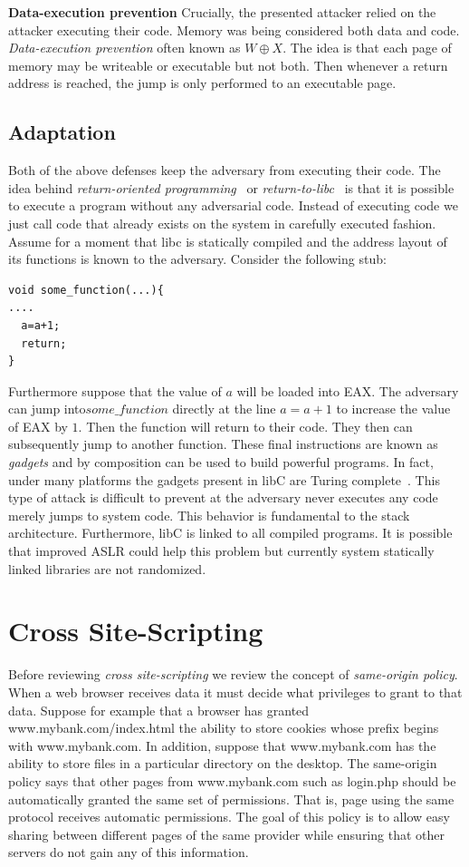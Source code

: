 \documentclass{article}
\begin{document}
\textbf{Data-execution prevention}
Crucially, the presented attacker relied on the attacker executing their code.  Memory was being considered both data and code.  \emph{Data-execution prevention} often known as $W\oplus X$.  The idea is that each page of memory may be writeable or executable but not both.  Then whenever a return address is reached, the jump is only performed to an executable page.

\subsection{Adaptation}
Both of the above defenses keep the adversary from executing their code.  The idea behind \emph{return-oriented programming}~\cite{shachamROP} or \emph{return-to-libc}~\cite{shachamReturnLibC} is that it is possible to execute a program without any adversarial code.  Instead of executing code we just call code that already exists on the system in carefully executed fashion.  Assume for a moment that libc is statically compiled and the address layout of its functions is known to the adversary.  Consider the following stub:

\begin{lstlisting}
void some_function(...){
....
  a=a+1;
  return;
}
\end{lstlisting}

Furthermore suppose that the value of $a$ will be loaded into EAX.  The adversary can jump into$some\_function$ directly at the line $a=a+1$ to increase the value of EAX by $1$.  Then the function will return to their code.  They then can subsequently jump to another function.  These final instructions are known as \emph{gadgets} and by composition can be used to build powerful programs.  In fact, under many platforms the gadgets present in libC are Turing complete~\cite{shachamROPcomplete}.  This type of attack is difficult to prevent at the adversary never executes any code merely jumps to system code.  This behavior is fundamental to the stack architecture.  Furthermore, libC is linked to all compiled programs.  It is possible that improved ASLR could help this problem but currently system statically linked libraries are not randomized.
\section{Cross Site-Scripting}\label{sec:xss}

Before reviewing \emph{cross site-scripting} we review the concept of \emph{same-origin policy}.  When a web browser receives data it must decide what privileges to grant to that data.  Suppose for example that a browser has granted www.mybank.com/index.html the ability to store cookies whose prefix begins with www.mybank.com.  In addition, suppose that www.mybank.com has the ability to store files in a particular directory on the desktop.  The same-origin policy says that other pages from www.mybank.com such as login.php should be automatically granted the same set of permissions.  That is, page using the same protocol receives automatic permissions.  The goal of this policy is to allow easy sharing between different pages of the same provider while ensuring that other servers do not gain any of this information.
\end{document}

